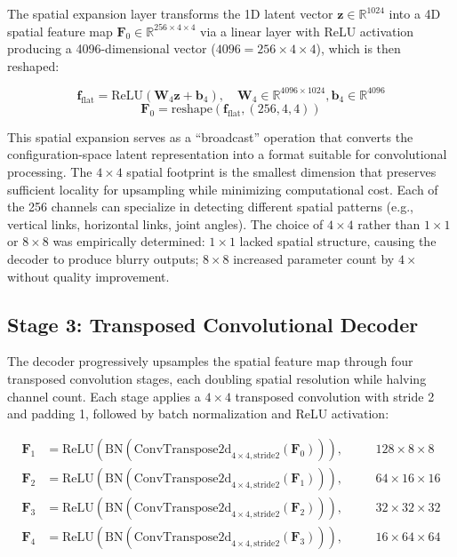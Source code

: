 \documentclass[12pt,a4paper,oneside]{report}
\begin{document}
The spatial expansion layer transforms the 1D latent vector $\mathbf{z} \in \mathbb{R}^{1024}$ into a 4D spatial feature map $\mathbf{F}_0 \in \mathbb{R}^{256 \times 4 \times 4}$ via a linear layer with ReLU activation producing a 4096-dimensional vector ($4096 = 256 \times 4 \times 4$), which is then reshaped:

\begin{equation}
\mathbf{f}_{\text{flat}} = \text{ReLU}(\mathbf{W}_4 \mathbf{z} + \mathbf{b}_4), \quad \mathbf{W}_4 \in \mathbb{R}^{4096 \times 1024}, \mathbf{b}_4 \in \mathbb{R}^{4096}
\end{equation}
\begin{equation}
\mathbf{F}_0 = \text{reshape}(\mathbf{f}_{\text{flat}}, (256, 4, 4))
\end{equation}

This spatial expansion serves as a ``broadcast'' operation that converts the configuration-space latent representation into a format suitable for convolutional processing. The $4 \times 4$ spatial footprint is the smallest dimension that preserves sufficient locality for upsampling while minimizing computational cost. Each of the 256 channels can specialize in detecting different spatial patterns (e.g., vertical links, horizontal links, joint angles). The choice of $4 \times 4$ rather than $1 \times 1$ or $8 \times 8$ was empirically determined: $1 \times 1$ lacked spatial structure, causing the decoder to produce blurry outputs; $8 \times 8$ increased parameter count by $4\times$ without quality improvement.

\subsection{Stage 3: Transposed Convolutional Decoder}
\label{subsec:stage_3_transposed_convolutional_decoder}

The decoder progressively upsamples the spatial feature map through four transposed convolution stages, each doubling spatial resolution while halving channel count. Each stage applies a $4 \times 4$ transposed convolution with stride 2 and padding 1, followed by batch normalization and ReLU activation:

\begin{align}
\mathbf{F}_1 &= \text{ReLU}(\text{BN}(\text{ConvTranspose2d}_{4\times4,\text{stride}2}(\mathbf{F}_0))), &\quad &128 \times 8 \times 8 \\
\mathbf{F}_2 &= \text{ReLU}(\text{BN}(\text{ConvTranspose2d}_{4\times4,\text{stride}2}(\mathbf{F}_1))), &\quad &64 \times 16 \times 16 \\
\mathbf{F}_3 &= \text{ReLU}(\text{BN}(\text{ConvTranspose2d}_{4\times4,\text{stride}2}(\mathbf{F}_2))), &\quad &32 \times 32 \times 32 \\
\mathbf{F}_4 &= \text{ReLU}(\text{BN}(\text{ConvTranspose2d}_{4\times4,\text{stride}2}(\mathbf{F}_3))), &\quad &16 \times 64 \times 64
\end{align}
\end{document}
